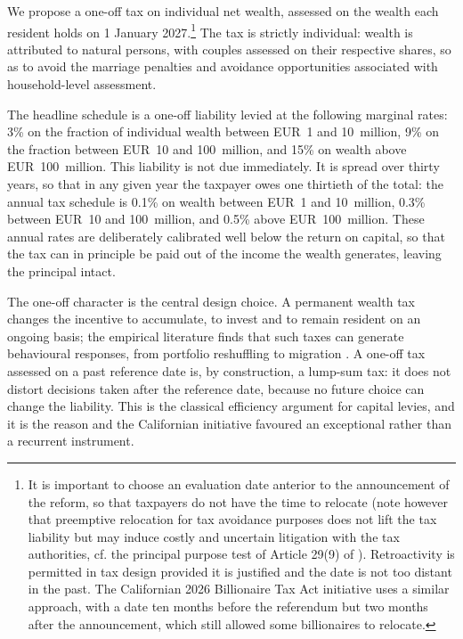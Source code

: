 \documentclass[../../main]{subfiles}
\begin{document}
We propose a one-off tax on individual net wealth, assessed on the wealth each resident holds on 1 January 2027.\footnote{It is important to choose an evaluation date anterior to the announcement of the reform, so that taxpayers do not have the time to relocate (note however that preemptive relocation for tax avoidance purposes does not lift the tax liability but may induce costly and uncertain litigation with the tax authorities, cf. the principal purpose test of Article 29(9) of \citealp{oecd_model_2017}). Retroactivity is permitted in tax design provided it is justified and the date is not too distant in the past. The Californian 2026 Billionaire Tax Act initiative uses a similar approach, with a date ten months before the referendum but two months after the announcement, which still allowed some billionaires to relocate.} The tax is strictly individual: wealth is attributed to natural persons, with couples assessed on their respective shares, so as to avoid the marriage penalties and avoidance opportunities associated with household-level assessment.

The headline schedule is a one-off liability levied at the following marginal rates: 3\% on the fraction of individual wealth between EUR~1 and 10~million, 9\% on the fraction between EUR~10 and 100~million, and 15\% on wealth above EUR~100~million. %
This liability is not due immediately. It is spread over thirty years, so that in any given year the taxpayer owes one thirtieth of the total: the annual tax schedule is 0.1\% on wealth between EUR~1 and 10~million, 0.3\% between EUR~10 and 100~million, and 0.5\% above EUR~100~million. These annual rates are deliberately calibrated well below the return on capital, so that the tax can in principle be paid out of the income the wealth generates, leaving the principal intact.

The one-off character is the central design choice. A permanent wealth tax changes the incentive to accumulate, to invest and to remain resident on an ongoing basis; the empirical literature finds that such taxes can generate %
behavioural responses, from portfolio reshuffling to migration \citep{Brulhartetal2022, DuranCabreetal2019}. A one-off tax assessed on a past reference date is, by construction, a lump-sum tax: it does not distort decisions taken after the reference date, because no future choice can change the liability. This is the classical efficiency argument for capital levies, and it is the reason \citet{PisaniFerryMahfouz2023} and the Californian initiative favoured an exceptional rather than a recurrent instrument.
\end{document}
